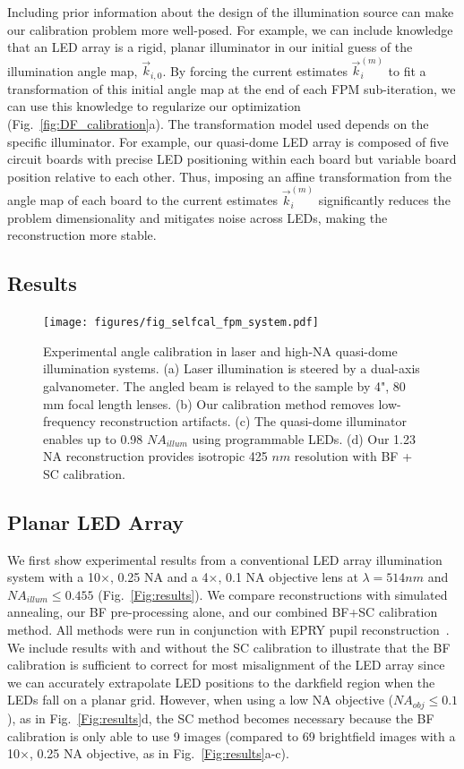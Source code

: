 Including prior information about the design of the illumination source can make our calibration problem more well-posed. For example, we can include knowledge that an LED array is a rigid, planar illuminator in our initial guess of the illumination angle map, $\vec{k}_{i,0}$. By forcing the current estimates $\vec{k}_i^{(m)}$ to fit a transformation of this initial angle map at the end of each FPM sub-iteration, we can use this knowledge to regularize our optimization (Fig.~\ref{fig:DF_calibration}a). The transformation model used depends on the specific illuminator. For example, our quasi-dome LED array is composed of five circuit boards with precise LED positioning within each board but variable board position relative to each other. Thus, imposing an affine transformation from the angle map of each board to the current estimates $\vec{k}_i^{(m)}$ significantly reduces the problem dimensionality and mitigates noise across LEDs, making the reconstruction more stable.

\subsection{Results}

\begin{figure} [t]
	\centering
	\texttt{[image: figures/fig\_selfcal\_fpm\_system.pdf]}
	\caption{Experimental angle calibration in laser and high-NA quasi-dome illumination systems. (a) Laser illumination is steered by a dual-axis galvanometer. The angled beam is relayed to the sample by 4", 80 mm focal length lenses. (b) Our calibration method removes low-frequency reconstruction artifacts. (c) The quasi-dome illuminator enables up to 0.98 $NA_{illum}$ using programmable LEDs. (d) Our 1.23 NA reconstruction provides isotropic 425 $nm$ resolution with BF + SC calibration.
		}
	\label{Fig:laserDome}
\end{figure}

\subsection{Planar LED Array}
We first show experimental results from a conventional LED array illumination system with a 10$\times$, 0.25 NA and a 4$\times$, 0.1 NA objective lens at $\lambda = 514 nm$ and $NA_{illum} \leq 0.455$ (Fig.~\ref{Fig:results}). We compare reconstructions with simulated annealing, our BF pre-processing alone, and our combined BF+SC calibration method. All methods were run in conjunction with EPRY pupil reconstruction~\cite{Ou:14}. We include results with and without the SC calibration to illustrate that the BF calibration is sufficient to correct for most misalignment of the LED array since we can accurately extrapolate LED positions to the darkfield region when the LEDs fall on a planar grid. However, when using a low NA objective ($NA_{obj} \leq 0.1$), as in Fig.~\ref{Fig:results}d, the SC method becomes necessary because the BF calibration is only able to use 9 images (compared to 69 brightfield images with a 10$\times$, 0.25 NA objective, as in Fig.~\ref{Fig:results}a-c).

